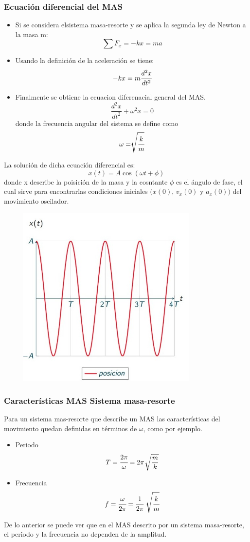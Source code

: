 \subsubsection{Ecuación diferencial del MAS}
\begin{itemize}[label=\textbf{$\bullet$},itemsep=2pt,partopsep=6pt,parsep=6pt]
	\item Si se considera elsistema masa-resorte y se aplica la segunda ley de Newton a la masa m:
	      \[\sum F_x=-kx=ma\]
	\item Usando la definición de la aceleración se tiene:
	      \[-kx=m\cfrac{d^2 x}{dt^2}\]
	\item Finalmente se obtiene la ecuacion diferenacial general del MAS\@.
	      \[\frac{d^2 x}{dt^2}+\omega^2 x=0\]
	      donde la frecuencia angular del sistema se define como
	      \[\omega=\sqrt[]{\cfrac{k}{m}}\]
\end{itemize}
La solución de dicha ecuación diferencial es:
\[x(t)=A\cos (\omega t+ \phi)\]
donde x describe la poisición de la masa y la cosntante $\phi$ es el ángulo de fase, el cual sirve para encontrarlas condiciones iniciales $(x(0)$, $v_x (0)$ y  $a_x(0))$ del movimiento oscilador.
\begin{figure}[H]
	\centering
	\includegraphics[width=9cm]{Images/min_i.jpeg}
\end{figure}
\subsubsection{Características MAS Sistema masa-resorte}
Para un sistema mas-resorte que describe un MAS las características del movimiento quedan definidas en términos de $\omega$, como por ejemplo.
\begin{itemize}[label=\textbf{$\bullet$},itemsep=2pt,partopsep=6pt,parsep=6pt]
	\item Periodo
	      \[T=\cfrac{2\pi}{\omega}=2\pi \text{ }\sqrt[]{\dfrac{m}{k}}\]
	\item Frecuencia
	      \[f=\cfrac{\omega}{2\pi}=\cfrac{1}{2\pi}\text{ }\sqrt{\cfrac{k}{m}}\]
\end{itemize}
De lo anterior se puede ver que en el MAS descrito por un sistema masa-resorte, el periodo y la frecuencia no dependen de la amplitud.%
